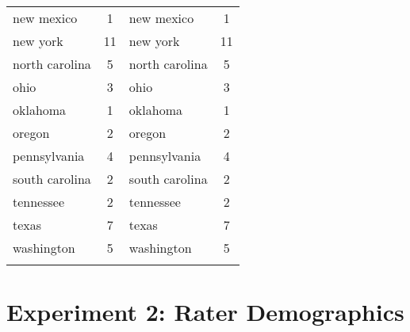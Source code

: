 \begin{longtable}{lclc}
new mexico        & 1            & new mexico     & 1            \\
new york          & 11           & new york       & 11           \\
north carolina    & 5            & north carolina & 5            \\
ohio              & 3            & ohio           & 3            \\
oklahoma          & 1            & oklahoma       & 1            \\
oregon            & 2            & oregon         & 2            \\
pennsylvania      & 4            & pennsylvania   & 4            \\
south carolina    & 2            & south carolina & 2            \\
tennessee         & 2            & tennessee      & 2            \\
texas             & 7            & texas          & 7            \\
washington        & 5            & washington     & 5           \\
\hline
\label{table:bp1}
\end{longtable}
\figSpace

\section{Experiment 2: Rater Demographics}


